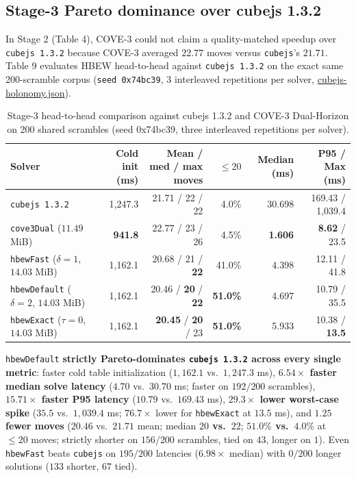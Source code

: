 \documentclass[10pt,twocolumn,letterpaper]{article}
\begin{document}
\hypertarget{stage-3-pareto-dominance-over-cubejs-1.3.2}{%
\subsection{Stage-3 Pareto dominance over cubejs 1.3.2}\label{stage-3-pareto-dominance-over-cubejs-1.3.2}}

In Stage 2 (Table 4), COVE-3 could not claim a quality-matched speedup
over \texttt{cubejs\ 1.3.2} \cite{cubejs} because COVE-3 averaged
\(22.77\) moves versus \texttt{cubejs}'s \(21.71\). Table 9 evaluates
HBEW head-to-head against \texttt{cubejs\ 1.3.2} on the exact same
200-scramble corpus (\texttt{seed\ 0x74bc39}, 3 interleaved repetitions
per solver,
\href{https://github.com/nahin333/rubikscube/blob/main/research/results/cubejs-holonomy.json}{cubejs-holonomy.json}).

\begin{table}[t]
\caption{Stage-3 head-to-head comparison against cubejs 1.3.2 and COVE-3 Dual-Horizon on 200 shared scrambles (seed 0x74bc39, three interleaved repetitions per solver).}
\centering\small
\begin{tabularx}{\textwidth}{@{}Lrrrrr@{}}
\toprule
Solver & Cold init (ms) & Mean / med / max moves & \(\le 20\) & Median (ms) & P95 / Max (ms) \\
\midrule
\texttt{cubejs\ 1.3.2} \cite{cubejs} & 1,247.3 & 21.71 / 22 / 22 & 4.0\% & 30.698 & 169.43 / 1,039.4 \\
\texttt{cove3Dual} (\(11.49\) MiB) & \textbf{941.8} & 22.77 / 23 / 26 & 4.5\% & \textbf{1.606} & \textbf{8.62} / 23.5 \\
\texttt{hbewFast} (\(\delta=1\), \(14.03\) MiB) & 1,162.1 & 20.68 / 21 / \textbf{22} & 41.0\% & 4.398 & 12.11 / 41.8 \\
\texttt{hbewDefault} (\(\delta=2\), \(14.03\) MiB) & 1,162.1 & 20.46 / \textbf{20} / \textbf{22} & \textbf{51.0\%} & 4.697 & 10.79 / 35.5 \\
\texttt{hbewExact} (\(\tau=0\), \(14.03\) MiB) & 1,162.1 & \textbf{20.45} / \textbf{20} / 23 & \textbf{51.0\%} & 5.933 & 10.38 / \textbf{13.5} \\
\bottomrule
\end{tabularx}
\end{table}

\texttt{hbewDefault} \textbf{strictly Pareto-dominates
\texttt{cubejs\ 1.3.2} across every single metric}: faster cold table
initialization (\(1,162.1\) vs.~\(1,247.3\) ms), \textbf{\(6.54\times\)
faster median solve latency} (\(4.70\) vs.~\(30.70\) ms; faster on
\textbf{\(192/200\)} scrambles), \textbf{\(15.71\times\) faster P95
latency} (\(10.79\) vs.~\(169.43\) ms), \textbf{\(29.3\times\) lower
worst-case spike} (\(35.5\) vs.~\(1,039.4\) ms; \(76.7\times\) lower for
\texttt{hbewExact} at \(13.5\) ms), and \textbf{\(1.25\) fewer moves}
(\(20.46\) vs.~\(21.71\) mean; median \textbf{\(20\) vs.~\(22\)};
\textbf{\(51.0\%\) vs.~\(4.0\%\)} at \(\le 20\) moves; strictly shorter
on \(156/200\) scrambles, tied on \(43\), longer on \(1\)). Even
\texttt{hbewFast} beats \texttt{cubejs} on \textbf{\(195/200\)}
latencies (\(6.98\times\) median) with \textbf{\(0/200\)} longer
solutions (\(133\) shorter, \(67\) tied).
\end{document}
